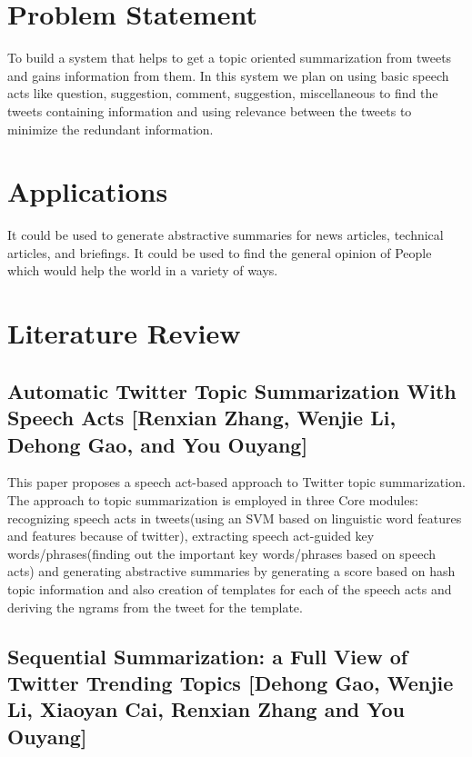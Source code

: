 \documentclass[conference]{IEEEtran}
\begin{document}
\IEEEpeerreviewmaketitle
\section{\textbf{Problem Statement}}

\par To build a system that helps to get a topic oriented summarization from tweets and gains information from them. In this system we plan on using basic speech acts like question, suggestion, comment, suggestion, miscellaneous  to find the tweets containing information and using relevance between the tweets to minimize the redundant information.

\section{\textbf{Applications}}

\par It could be used to generate abstractive summaries for news articles, technical articles, and briefings. It could be used to find the general opinion of People which would help the world in a variety of ways.

\section{\textbf{Literature Review}}

\subsection{\textbf{Automatic Twitter Topic Summarization With Speech Acts [Renxian Zhang, Wenjie Li, Dehong Gao, and You Ouyang]}}

\par This paper proposes a speech act-based approach to Twitter topic summarization. The approach to topic summarization is employed in three Core modules: recognizing speech acts in tweets(using an SVM based on linguistic word features and features because of twitter), extracting speech act-guided key words/phrases(finding out the important key words/phrases based on speech acts) and generating abstractive summaries by generating a score based on hash topic information and also creation of templates for each of the speech acts and deriving the ngrams from the tweet for the template.

\subsection{\textbf{Sequential Summarization: a Full View of Twitter Trending Topics [Dehong Gao, Wenjie Li, Xiaoyan Cai, Renxian Zhang and You Ouyang]}}
\end{document}
